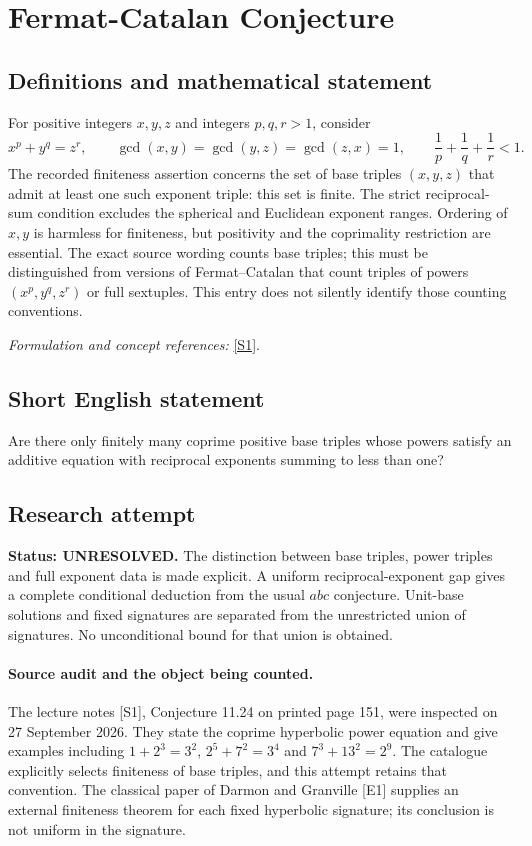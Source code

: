 \documentclass[11pt]{article}
\begin{document}
\section*{\texorpdfstring{Fermat-Catalan Conjecture}{Fermat-Catalan Conjecture}}\label{1289}
\subsection{Definitions and mathematical statement}
For positive integers $x,y,z$ and integers $p,q,r>1$, consider
\[
 x^p+y^q=z^r,\qquad
 \gcd(x,y)=\gcd(y,z)=\gcd(z,x)=1,
 \qquad\frac1p+\frac1q+\frac1r<1.
\]
The recorded finiteness assertion concerns the set of base triples $(x,y,z)$ that admit at least one such exponent triple: this set is finite. The strict reciprocal-sum condition excludes the spherical and Euclidean exponent ranges. Ordering of $x,y$ is harmless for finiteness, but positivity and the coprimality restriction are essential. The exact source wording counts base triples; this must be distinguished from versions of Fermat--Catalan that count triples of powers $(x^p,y^q,z^r)$ or full sextuples. This entry does not silently identify those counting conventions.
\par\smallskip\textit{Formulation and concept references:} \href{https://home.cit.tum.de/~wvi/NT.pdf}{[S1]}.

\subsection{Short English statement}
Are there only finitely many coprime positive base triples whose powers satisfy an additive equation with reciprocal exponents summing to less than one?
\subsection{Research attempt}
\textbf{Status: UNRESOLVED.} The distinction between base triples, power triples and full exponent data is made explicit. A uniform reciprocal-exponent gap gives a complete conditional deduction from the usual $abc$ conjecture. Unit-base solutions and fixed signatures are separated from the unrestricted union of signatures. No unconditional bound for that union is obtained.

\paragraph{Source audit and the object being counted.}
The lecture notes [S1], Conjecture 11.24 on printed page 151, were inspected on 27 September 2026. They state the coprime hyperbolic power equation and give examples including $1+2^3=3^2$, $2^5+7^2=3^4$ and $7^3+13^2=2^9$. The catalogue explicitly selects finiteness of base triples, and this attempt retains that convention. The classical paper of Darmon and Granville [E1] supplies an external finiteness theorem for each fixed hyperbolic signature; its conclusion is not uniform in the signature.
\end{document}
